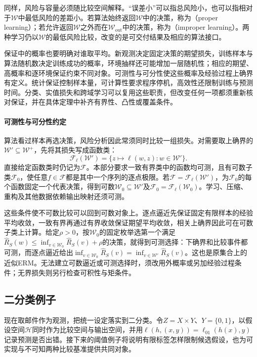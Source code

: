 同样，风险与容量必须随比较空间解释。“误差小”可以指总风险小，也可以指相对于$\mathcal W$中最低风险的差距小。若算法始终返回$\mathcal W$中的决策，称为（proper learning）；若允许返回$\mathcal W$之外而在$\mathcal W_{\mathrm{out}}$中的决策，称为（improper learning）。两种学习仍以$\mathcal W$的最低风险比较，改变的是可交付结果及相应的算法接口。

保证中的概率也要明确对谁取平均。新观测决定固定决策的期望损失，训练样本与算法随机数决定训练成功的概率，环境抽样还可能增加一层随机性；相应的期望、高概率和逐环境保证约束不同对象。可测性与可分性使这些概率及经验过程上确界有定义。统计保证控制样本量，可计算性要求程序停机，高效性还限制训练与预测时间。分类、实值损失和跨域学习可以复用这些职责，但改变任何一项都须重新核对保证，并在具体定理中补齐有界性、凸性或覆盖条件。

\paragraph{可测性与可分性约定}

算法看过样本再选决策，风险分析因此常须同时比较一组损失。对需要取上确界的$\mathcal W'\subseteq\mathcal W^+$，先将其损失写成函数类：
\[
 \mathcal F_\ell(\mathcal W')
 =\{z\mapsto\ell(w,z):w\in\mathcal W'\}.
\]
直接给定函数类时仍记为$\mathcal F$。本部分要求一致有界类中的函数均可测，且有可数子类$\mathcal F_0$，使任意$f\in\mathcal F$都是其中一个序列的逐点极限。若$\mathcal F=\mathcal F_\ell(\mathcal W')$，为$\mathcal F_0$的每个函数固定一个代表决策，得到可数$\mathcal W_0\subseteq\mathcal W'$及$\mathcal F_0=\mathcal F_\ell(\mathcal W_0)$。学习、压缩、重构及其他数据依赖输出映射还须可测。

这些条件使不可数比较可以回到可数对象上。逐点逼近先保证固定有限样本的经验平均收敛，一致有界再通过有界收敛保证期望平均收敛，相关上确界因此可在可数子类上计算。给定$\rho>0$，按$\mathcal W_0$的固定枚举选第一个满足$\hat R_S(w)\leq\inf_{v\in\mathcal W_0}\hat R_S(v)+\rho$的决策，就得到可测选择：下确界和比较事件都可测，而逐点逼近给出$\inf_{v\in\mathcal W_0}\hat R_S(v)=\inf_{v\in\mathcal W'}\hat R_S(v)$。这也是原集合上的近似ERM。无法建立可数逼近或可测选择时，须改用外概率或另加经验过程条件；无界损失则另行检查可积性与矩条件。

\subsection{二分类例子}

现在取邮件作为观测，把统一设定落实到二分类。令$Z=X\times Y$、$Y=\{0,1\}$，以假设空间$\mathcal H$同时作为比较空间与输出空间，并用$\ell(h,(x,y))=\ell_{01}(h(x),y)$记录预测是否出错。接下来的阈值例子将说明有限标签怎样限制候选假设，也为可实现与不可知两种比较基准提供共同对象。

